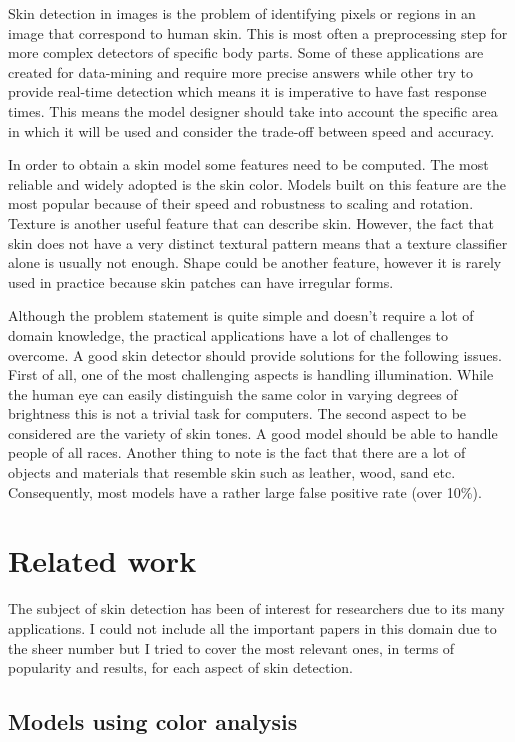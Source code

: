 \documentclass[12pt]{report}
\begin{document}
	Skin detection in images is the problem of identifying pixels or regions in an image that correspond to human skin. This is most often a preprocessing step for more complex detectors of specific body parts. Some of these applications are created for data-mining and require more precise answers while other try to provide real-time detection which means it is imperative to have fast response times. This means the model designer should take into account the specific area in which it will be used and consider the trade-off between speed and accuracy.
	
	In order to obtain a skin model some features need to be computed. The most reliable and widely adopted is the skin color. Models built on this feature are the most popular because of their speed and robustness to scaling and rotation\cite{survey_skin_color_modeling}. Texture is another useful feature that can describe skin. However, the fact that skin does not have a very distinct textural pattern means that a texture classifier alone is usually not enough. Shape could be another feature, however it is rarely used in practice because skin patches can have irregular forms.
	
	Although the problem statement is quite simple and doesn't require a lot of domain knowledge, the practical applications have a lot of challenges to overcome. A good skin detector should provide solutions for the following issues\cite{survey_skin_color_modeling}. First of all, one of the most challenging aspects is handling illumination. While the human eye can easily distinguish the same color in varying degrees of brightness this is not a trivial task for computers. The second aspect to be considered are the variety of skin tones. A good model should be able to handle people of all races. Another thing to note is the fact that there are a lot of objects and materials that resemble skin such as leather, wood, sand etc. Consequently, most models have a rather large false positive rate (over 10\%).
	
	\section{Related work}
	The subject of skin detection has been of interest for researchers due to its many applications. I could not include all the important papers in this domain due to the sheer number but I tried to cover the most relevant ones, in terms of popularity and results, for each aspect of skin detection.
	
	\subsection{Models using color analysis}
	
\end{document}
